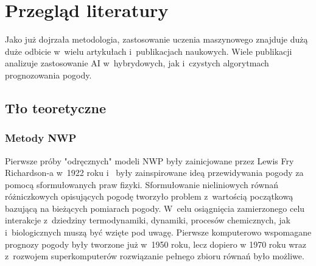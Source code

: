 

\section{Przegląd literatury}

Jako już dojrzała metodologia, zastosowanie uczenia maszynowego 
znajduje dużą duże odbicie w~wielu artykułach i~publikacjach naukowych. 
Wiele publikacji analizuje zastosowanie AI w~hybrydowych, jak i~czystych 
algorytmach prognozowania pogody. 


\subsection{Tło teoretyczne}


\subsubsection*{Metody NWP}

Pierwsze próby "odręcznych" modeli NWP były zainicjowane przez Lewis Fry Richardson-a w~1922 roku i~
były zainspirowane ideą przewidywania pogody za pomocą sformułowanych praw fizyki. Sformułowanie
nieliniowych równań różniczkowych opisujących pogodę tworzyło problem z~wartością początkową bazującą
na bieżących pomiarach pogody. W~celu osiągnięcia zamierzonego celu interakcje z~dziedziny 
termodynamiki, dynamiki, procesów chemicznych, jak i~biologicznych muszą być wzięte pod uwagę.
Pierwsze komputerowo wspomagane prognozy pogody były tworzone już w~1950 roku, lecz dopiero
w 1970 roku wraz z~rozwojem superkomputerów rozwiązanie pełnego zbioru równań było możliwe.

